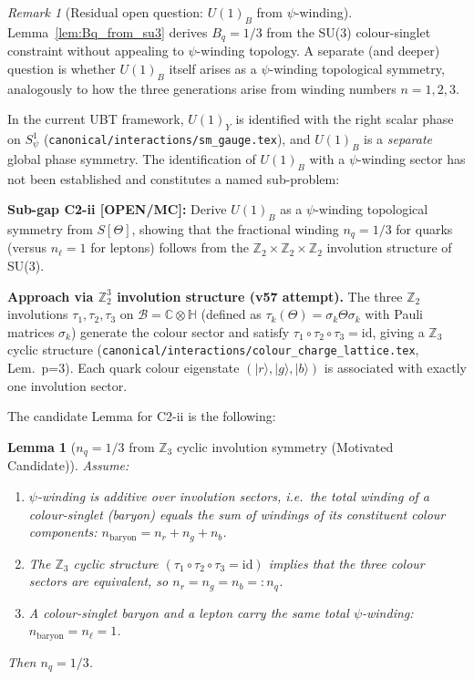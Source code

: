 \documentclass[12pt,a4paper]{article}
\newtheorem{lemma}[theorem]{Lemma}
\theoremstyle{definition}
\theoremstyle{remark}
\newtheorem{remark}[theorem]{Remark}
\begin{document}
\begin{remark}[Residual open question: $U(1)_B$ from $\psi$-winding]
\label{rem:c2ii_psi_winding}
Lemma~\ref{lem:Bq_from_su3} derives $B_q=1/3$ from the SU(3) colour-singlet
constraint without appealing to $\psi$-winding topology.
A separate (and deeper) question is whether $U(1)_B$ itself arises as a
$\psi$-winding topological symmetry, analogously to how the three generations
arise from winding numbers $n=1,2,3$.

In the current UBT framework, $U(1)_Y$ is identified with the right scalar
phase on $S^1_\psi$ (\texttt{canonical/interactions/sm\_gauge.tex}), and $U(1)_B$
is a \emph{separate} global phase symmetry.  The identification of $U(1)_B$
with a $\psi$-winding sector has not been established and constitutes a
named sub-problem:

\textbf{Sub-gap C2-ii [OPEN/MC]:} Derive $U(1)_B$ as a $\psi$-winding
topological symmetry from $S[\Theta]$, showing that the fractional winding
$n_q = 1/3$ for quarks (versus $n_\ell = 1$ for leptons) follows from
the $\mathbb{Z}_2{\times}\mathbb{Z}_2{\times}\mathbb{Z}_2$ involution
structure of SU(3).

\medskip
\noindent\textbf{Approach via $\mathbb{Z}_2^3$ involution structure (v57 attempt).}
The three $\mathbb{Z}_2$ involutions $\tau_1,\tau_2,\tau_3$ on
$\mathcal{B}=\mathbb{C}\otimes\mathbb{H}$ (defined as $\tau_k(\Theta)=\sigma_k\Theta\sigma_k$
with Pauli matrices $\sigma_k$) generate the colour sector and satisfy
$\tau_1\circ\tau_2\circ\tau_3=\mathrm{id}$,
giving a $\mathbb{Z}_3$ cyclic structure
(\texttt{canonical/interactions/colour\_charge\_lattice.tex}, Lem.~p=3).
Each quark colour eigenstate $(|r\rangle,|g\rangle,|b\rangle)$ is associated
with exactly one involution sector.

The candidate Lemma for C2-ii is the following:

\begin{lemma}[$n_q=1/3$ from $\mathbb{Z}_3$ cyclic involution symmetry (Motivated Candidate)]
\label{lem:c2ii_candidate}
Assume:
\begin{enumerate}
  \item[(i)] $\psi$-winding is additive over involution sectors, i.e.\ the
    total winding of a colour-singlet (baryon) equals the sum of windings of
    its constituent colour components: $n_{\mathrm{baryon}}=n_r+n_g+n_b$.
  \item[(ii)] The $\mathbb{Z}_3$ cyclic structure $(\tau_1\circ\tau_2\circ\tau_3=\mathrm{id})$
    implies that the three colour sectors are equivalent, so
    $n_r=n_g=n_b=:n_q$.
  \item[(iii)] A colour-singlet baryon and a lepton carry the same total
    $\psi$-winding: $n_{\mathrm{baryon}}=n_\ell=1$.
\end{enumerate}
Then $n_q = 1/3$.
\end{lemma}


\end{remark}
\end{document}
